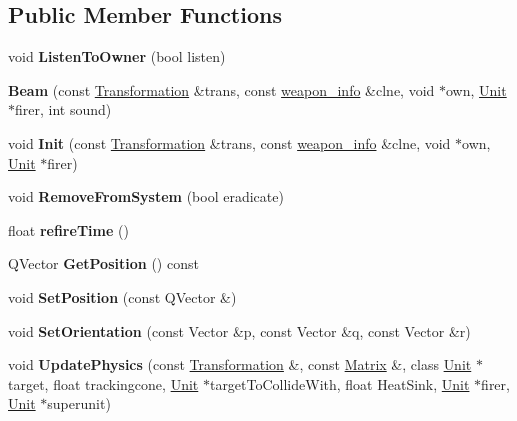\subsection*{Public Member Functions}
\begin{DoxyCompactItemize}
\item 
void {\bfseries Listen\+To\+Owner} (bool listen)\hypertarget{classBeam_a185ae23ad9f8f7e38436670e24500f83}{}\label{classBeam_a185ae23ad9f8f7e38436670e24500f83}

\item 
{\bfseries Beam} (const \hyperlink{structTransformation}{Transformation} \&trans, const \hyperlink{structweapon__info}{weapon\+\_\+info} \&clne, void $\ast$own, \hyperlink{classUnit}{Unit} $\ast$firer, int sound)\hypertarget{classBeam_a134201794f977941d454408e9223869e}{}\label{classBeam_a134201794f977941d454408e9223869e}

\item 
void {\bfseries Init} (const \hyperlink{structTransformation}{Transformation} \&trans, const \hyperlink{structweapon__info}{weapon\+\_\+info} \&clne, void $\ast$own, \hyperlink{classUnit}{Unit} $\ast$firer)\hypertarget{classBeam_a24a19ca4b4295a7dcdbec5b706dc7817}{}\label{classBeam_a24a19ca4b4295a7dcdbec5b706dc7817}

\item 
void {\bfseries Remove\+From\+System} (bool eradicate)\hypertarget{classBeam_abfcfde6cd518afafc4ec5bb823b33d70}{}\label{classBeam_abfcfde6cd518afafc4ec5bb823b33d70}

\item 
float {\bfseries refire\+Time} ()\hypertarget{classBeam_a9dd4ef3f8649bc256bec7f863c732b33}{}\label{classBeam_a9dd4ef3f8649bc256bec7f863c732b33}

\item 
Q\+Vector {\bfseries Get\+Position} () const \hypertarget{classBeam_a594d27784228c4618084db18c10de41d}{}\label{classBeam_a594d27784228c4618084db18c10de41d}

\item 
void {\bfseries Set\+Position} (const Q\+Vector \&)\hypertarget{classBeam_ab448d0bfc9caac901b0d930d87a5985c}{}\label{classBeam_ab448d0bfc9caac901b0d930d87a5985c}

\item 
void {\bfseries Set\+Orientation} (const Vector \&p, const Vector \&q, const Vector \&r)\hypertarget{classBeam_ae25ef88d1538c08b559a1f441bd1f0c6}{}\label{classBeam_ae25ef88d1538c08b559a1f441bd1f0c6}

\item 
void {\bfseries Update\+Physics} (const \hyperlink{structTransformation}{Transformation} \&, const \hyperlink{classMatrix}{Matrix} \&, class \hyperlink{classUnit}{Unit} $\ast$target, float trackingcone, \hyperlink{classUnit}{Unit} $\ast$target\+To\+Collide\+With, float Heat\+Sink, \hyperlink{classUnit}{Unit} $\ast$firer, \hyperlink{classUnit}{Unit} $\ast$superunit)\hypertarget{classBeam_a2e701af39de96784f641834697dc1480}{}\label{classBeam_a2e701af39de96784f641834697dc1480}


\end{DoxyCompactItemize}
